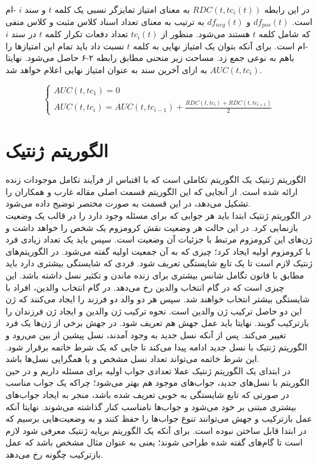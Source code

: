 در این رابطه
$RDC(t, tc_i(t))$
به معنای امتیاز تمایزگر نسبی یک کلمه
$t$
و سند
$i$
-ام است.
$df_{pos}(t)$
و
$df_{neg}(t)$
به ترتیب به معنای تعداد اسناد کلاس مثبت و کلاس منفی که شامل کلمه
$t$
هستند می‌شود. منظور از
$tc_i(t)$
تعداد دفعات تکرار کلمه
$t$
در سند
$i$
-ام است. برای آنکه بتوان یک امتیاز نهایی به کلمه
$t$
نسبت داد باید تمام این امتیازها را باهم به نوعی جمع زد. مساحت زیر منحنی مطابق رابطه ۲-۶ حاصل می‌شود. نهایتا
$AUC(t,tc_i)$
به ازای آخرین سند به عنوان امتیاز نهایی اعلام خواهد شد.

\begin{equation}
\begin{cases}
AUC(t,tc_1) = 0 \\
AUC(t,tc_i) = AUC(t,tc_{i-1}) + \frac{RDC(t,tc_i)+RDC(t,tc_{i+1})}{2}
\end{cases}
\end{equation}

\section{الگوریتم ژنتیک}
الگوریتم ژنتیک یک الگوریتم تکاملی است که با اقتباس از فرآیند تکامل موجودات زنده ارائه شده است. از آنجایی که این الگوریتم قسمت اصلی مقاله غارب و همکاران\cite{ghareb2016hybrid} را تشکیل می‌دهد، در این قسمت به صورت مختصر توضیح داده می‌شود.
\\

در الگوریتم ژنتیک ابتدا باید هر جوابی که برای مسئله وجود دارد را در قالب یک وضعیت بازنمایی کرد. در این حالت هر وضعیت نقش کرومزوم یک شخص را خواهد داشت و ژن‌های این کرومزوم مرتبط با جزئیات آن وضعیت است. سپس باید یک تعداد زیادی فرد با کرومزوم اولیه ایجاد کرد؛ چیزی که به آن جمعیت اولیه گفته می‌شود. در الگوریتم‌های ژنتیک لازم است تا یک تابع شایستگی تعریف شود. فردی که شایستگی بیشتری دارد باید مطابق با قانون تگامل شانس بیشتری برای زنده ماندن و تکثیر نسل داشته باشد. این چیزی است که در گام انتخاب والدین رخ می‌دهد. در گام انتخاب والدین، افراد با شایستگی بیشتر انتخاب خواهند شد. سپس هر دو والد دو فرزند را ایجاد می‌کنند که ژن این دو حاصل ترکیب ژن والدین است. نحوه ترکیب ژن والدین و ایجاد ژن فرزندان را بازترکیب گویند. نهایتا باید عمل جهش هم تعریف شود. در جهش برخی از ژن‌ها یک فرد تغییر می‌کند. پس از آنکه نسل جدید به وجود آمدند، نسل پیشین از بین می‌رود و الگوریتم ژنتیک با نسل جدید ادامه پیدا می‌کند تا جایی که یک شرط خاتمه برقرار شود. این شرط خاتمه می‌تواند تعداد نسل مشخص و یا همگرایی نسل‌ها باشد.
\\

در ابتدای یک الگوریتم ژنتیک عملا تعدادی جواب اولیه برای مسئله داریم و در حین الگوریتم با نسل‌های جدید، جواب‌های موجود هم بهتر می‌شود؛ چراکه یک جواب مناسب در صورتی که تابع شایستگی به خوبی تعریف شده باشد، منجر به ایجاد جواب‌های بیشتری مبتنی بر خود می‌شود و جواب‌ها نامناسب کنار گذاشته می‌شوند. نهایتا آنکه عمل بازترکیب و جهش می‌توانند تنوع جواب‌ها را حفظ کنند و به وضعیت‌هایی برسیم که در ابتدا قابل ساختن نبوده است. برای آنکه یک الگوریتم برپایه ژنتیک معرفی شود لازم است تا گام‌های گفته شده طراحی شوند؛ یعنی به عنوان مثال مشخص باشد که عمل بازترکیب چگونه رخ می‌دهد.